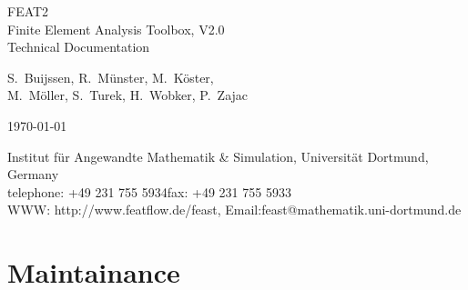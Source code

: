 \documentclass[10pt,a4paper]{report}
\begin{document}
\begin{titlepage}

\vspace*{4cm}

\begin{center}

{\Huge FEAT2}\\[2cm] 
{\huge Finite Element Analysis Toolbox, V2.0}\\[0.5cm] 

{\LARGE Technical Documentation}\\[3cm]

\vspace*{0.5cm}

{\large
 S.~Buijssen, R.~M\"unster, M.~K\"oster, \\[1em]
 M.~M\"oller, S.~Turek, H.~Wobker, P.~Zajac}

\vspace*{2cm}

\today

\vspace*{2cm}

Institut f{\"u}r Angewandte Mathematik \& Simulation, Universit{\"a}t Dortmund, Germany \\[0.5em]
telephone: +49 231 755 5934\qquad fax: +49 231 755 5933 \\[0.5em]
WWW: http://www.featflow.de/feast, Email:feast@mathematik.uni-dortmund.de

\end{center}

\end{titlepage}


\tableofcontents


\chapter{Maintainance}





%


%

%

%

\nocite{Turek1997c,Turek1998}


%
\printindex
\end{document}
